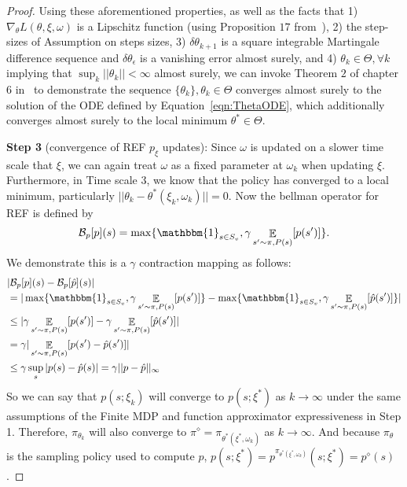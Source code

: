 \documentclass{article}
\theoremstyle{definition}
\DeclareMathOperator*{\E}{\mathbb{E}}
\begin{document}
\begin{proof}
Using these aforementioned properties, as well as the facts that 1) $\nabla_\theta L(\theta, \xi, \omega)$ is a Lipschitz function (using Proposition $17$ from~\cite{chow2017risk}), 2) the step-sizes of Assumption on steps sizes, 3) $\delta \theta_{k+1}$ is a square integrable Martingale difference sequence and $\delta\theta_\epsilon$ is a vanishing error almost surely, and 4) $\theta_k \in \Theta, \forall k$ implying that $\sup_k  ||\theta_k||<\infty$ almost surely, we can invoke Theorem $2$ of chapter $6$ in~\cite{borkar2009stochastic} to demonstrate the sequence $\{\theta_k\}, \theta_k\in \Theta$ converges almost surely to the solution of the ODE defined by Equation~\ref{eqn:ThetaODE}, which additionally converges almost surely to the local minimum $\theta^*\in \Theta$.

\textbf{Step 3} (convergence of REF $p_\xi$ updates): Since $\omega$ is updated on a slower time scale that $\xi$, we can again treat $\omega$ as a fixed parameter at $\omega_k$ when updating $\xi$. Furthermore, in Time scale $3$, we know that the policy has converged to a local minimum, particularly $||\theta_k-\theta^*(\xi_k,\omega_k)|| = 0$. Now the bellman operator for REF is defined by
\begin{align*}
    \mathcal{B}_p[p](s) = \max\{\mathbbm{1}_{s\in S_v}, \gamma \E_{s'\sim \pi, P(s)}[p(s')]\}.
\end{align*}
We demonstrate this is a $\gamma$ contraction mapping as follows:
\begin{align*}
    &|\mathcal{B}_p[p](s) - \mathcal{B}_p[\hat{p}](s) | \\
    &= |\max\{\mathbbm{1}_{s\in S_v},  \gamma \E_{s'\sim \pi, P(s)}[p(s')]\} - \max\{\mathbbm{1}_{s\in S_v},  \gamma \E_{s'\sim \pi, P(s)}[\hat{p}(s')]\}| \\
    &\leq |\gamma \E_{s'\sim \pi, P(s)}[p(s')] - \gamma \E_{s'\sim \pi, P(s)}[\hat{p}(s')]| \\
    &= \gamma |\E_{s'\sim \pi, P(s)}[p(s') -\hat{p}(s')]| \\
    &\leq \gamma \sup_{s}|p(s) -\hat{p}(s)|=
    \gamma ||p-\hat{p}||_\infty
\end{align*}
So we can say that $p(s;\xi_k)$ will converge to $p(s;\xi^*)$ as $k\rightarrow\infty$ under the same assumptions of the Finite MDP and function approximator expressiveness in Step 1. Therefore, $\pi_{\theta_k}$ will also converge to $\pi^\diamond = \pi_{\theta^*(\xi^*,\omega_k)}$ as $k\rightarrow\infty$. And because $\pi_\theta$ is the sampling policy used to compute $p$, $p(s;\xi^*)=p^{\pi_{\theta^*(\xi^*,\omega_k)}}(s;\xi^*)=p^\diamond (s)$.


\end{proof}
\end{document}
